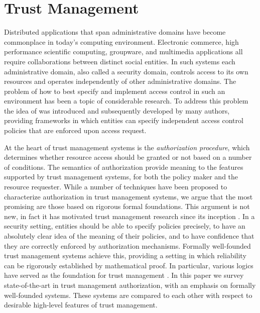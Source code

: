 
\chapter{Trust Management}
\label{chapter-trust-management}

Distributed applications that span administrative domains have become
commonplace in today's computing environment. Electronic commerce,
high performance scientific computing, groupware, and multimedia
applications all require collaborations between distinct social
entities.  In such systems each administrative domain, also called a
security domain, controls access to its own resources and operates
independently of other administrative domains. The problem of how to
best specify and implement access control in such an environment has
been a topic of considerable research. To address this problem the
idea of  was introduced
\cite{Blaze:DTM} and subsequently developed by many authors,
providing frameworks in which entities can specify independent access
control policies that are enforced upon access request.

At the heart of trust management systems is the \emph{authorization
procedure}, which determines whether resource access should be granted
or not based on a number of conditions.  The semantics of
authorization provide meaning to the features supported by trust
management systems, for both the policy maker and the resource
requester.  While a number of techniques have been proposed to
characterize authorization in trust management systems, we argue that
the most promising are those based on rigorous formal foundations.
This argument is not new, in fact it has motivated trust management
research since its inception \cite{woo93authorizations}.  In a
security setting, entities should be able to specify policies
precisely, to have an absolutely clear idea of the meaning of their
policies, and to have confidence that they are correctly enforced by
authorization mechanisms. Formally well-founded trust management
systems achieve this, providing a setting in which reliability can be
rigorously established by mathematical proof. In particular, various
logics have served as the foundation for trust management
\cite{Abadi:LAC,Bertino:LFRAACM}. In this paper we survey
state-of-the-art in trust management authorization, with an emphasis
on formally well-founded systems.  These systems are compared to each
other with respect to desirable high-level features of trust
management.

